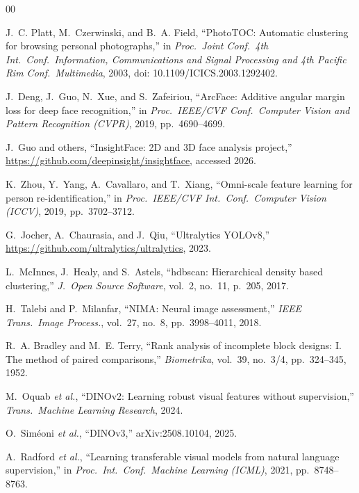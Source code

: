 \documentclass[conference]{IEEEtran}
\begin{document}
\balance
\begin{thebibliography}{00}

J.~C. Platt, M.~Czerwinski, and B.~A. Field,
``PhotoTOC: Automatic clustering for browsing personal photographs,''
in \emph{Proc.\ Joint Conf.\ 4th Int.\ Conf.\ Information, Communications
and Signal Processing and 4th Pacific Rim Conf.\ Multimedia},
2003, doi: 10.1109/ICICS.2003.1292402.

J.~Deng, J.~Guo, N.~Xue, and S.~Zafeiriou,
``ArcFace: Additive angular margin loss for deep face recognition,''
in \emph{Proc.\ IEEE/CVF Conf.\ Computer Vision and Pattern Recognition (CVPR)},
2019, pp.~4690--4699.

J.~Guo and others,
``InsightFace: 2D and 3D face analysis project,''
\url{https://github.com/deepinsight/insightface}, accessed 2026.

K.~Zhou, Y.~Yang, A.~Cavallaro, and T.~Xiang,
``Omni-scale feature learning for person re-identification,''
in \emph{Proc.\ IEEE/CVF Int.\ Conf.\ Computer Vision (ICCV)},
2019, pp.~3702--3712.

G.~Jocher, A.~Chaurasia, and J.~Qiu,
``Ultralytics YOLOv8,''
\url{https://github.com/ultralytics/ultralytics}, 2023.

L.~McInnes, J.~Healy, and S.~Astels,
``hdbscan: Hierarchical density based clustering,''
\emph{J.\ Open Source Software}, vol.~2, no.~11, p.~205, 2017.

H.~Talebi and P.~Milanfar,
``NIMA: Neural image assessment,''
\emph{IEEE Trans.\ Image Process.}, vol.~27, no.~8, pp.~3998--4011, 2018.

R.~A. Bradley and M.~E. Terry,
``Rank analysis of incomplete block designs: I. The method of paired comparisons,''
\emph{Biometrika}, vol.~39, no.~3/4, pp.~324--345, 1952.

M.~Oquab \emph{et al.},
``DINOv2: Learning robust visual features without supervision,''
\emph{Trans.\ Machine Learning Research}, 2024.

O.~Sim\'eoni \emph{et al.},
``\mbox{DINOv3},''
arXiv:2508.10104, 2025.

A.~Radford \emph{et al.},
``Learning transferable visual models from natural language supervision,''
in \emph{Proc.\ Int.\ Conf.\ Machine Learning (ICML)}, 2021, pp.~8748--8763.


\end{thebibliography}
\end{document}
